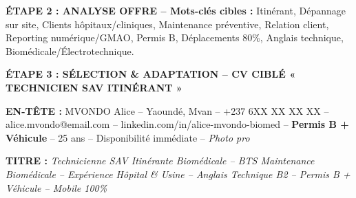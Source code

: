 \documentclass[11pt]{article}
\newcommand{\cle}[1]{{\popxbold\color{popdark}#1}}
\begin{document}
\begin{exoresolu}
    \textbf{ÉTAPE 2 : ANALYSE OFFRE -- Mots-clés cibles :}
    \cle{Itinérant}, \cle{Dépannage sur site}, \cle{Clients hôpitaux/cliniques}, \cle{Maintenance préventive}, \cle{Relation client}, \cle{Reporting numérique/GMAO}, \cle{Permis B}, \cle{Déplacements 80\%}, \cle{Anglais technique}, \cle{Biomédicale/Électrotechnique}.

    \textbf{ÉTAPE 3 : SÉLECTION \& ADAPTATION -- CV CIBLÉ « TECHNICIEN SAV ITINÉRANT »}

    \textbf{EN-TÊTE :} MVONDO Alice -- Yaoundé, Mvan -- +237 6XX XX XX XX -- alice.mvondo@email.com -- linkedin.com/in/alice-mvondo-biomed -- \textbf{Permis B + Véhicule} -- 25 ans -- Disponibilité immédiate -- \textit{Photo pro}

    \textbf{TITRE :} \textit{Technicienne SAV Itinérante Biomédicale -- BTS Maintenance Biomédicale -- Expérience Hôpital \& Usine -- Anglais Technique B2 -- Permis B + Véhicule -- Mobile 100\%}


\end{exoresolu}
\end{document}
